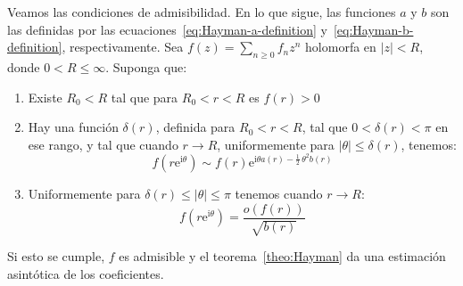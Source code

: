   Veamos las condiciones de admisibilidad.
  En lo que sigue,
  las funciones \(a\) y \(b\)
  son las definidas
  por las ecuaciones~\eqref{eq:Hayman-a-definition}
  y~\eqref{eq:Hayman-b-definition},
  respectivamente.
  Sea \(f(z) = \sum_{n \ge 0} f_n z^n\)
  holomorfa en \(\lvert z \rvert < R\),
  donde \(0 < R \le \infty\).
  Suponga que:
  \begin{enumerate}[label=(\alph*)]
  \item
    Existe \(R_0 < R\) tal que para \(R_0 < r < R\) es \(f(r) > 0\)
  \item
    Hay una función \(\delta(r)\),
    definida para \(R_0 < r < R\),
    tal que \(0 < \delta(r) < \pi\) en ese rango,
    y tal que cuando \(r \rightarrow R\),
    uniformemente para \(\lvert \theta \rvert \le \delta(r)\),
    tenemos:
    \begin{equation*}
      f(r \mathrm{e}^{\mathrm{i} \theta})
	\sim f(r) \mathrm{e}^{\mathrm{i} \theta a(r)
				- \frac{1}{2} \, \theta^2 b(r)}
    \end{equation*}
  \item
    Uniformemente
    para \(\delta(r) \le \lvert \theta \rvert \le \pi\)
    tenemos cuando \(r \rightarrow R\):
    \begin{equation*}
      f(r \mathrm{e}^{\mathrm{i} \theta})
	= \frac{o(f(r))}{\sqrt{b(r)}}
    \end{equation*}
  \end{enumerate}
  Si esto se cumple,
  \(f\) es admisible y el teorema~\ref{theo:Hayman}
  da una estimación asintótica de los coeficientes.

